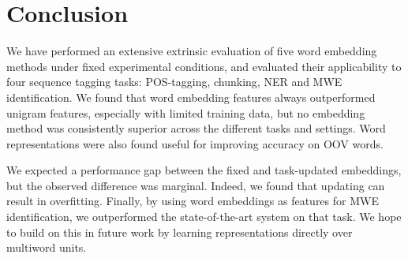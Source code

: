 \section{Conclusion}
We have performed an extensive extrinsic evaluation of five word embedding methods
under fixed experimental conditions, and evaluated their applicability to four sequence tagging tasks: POS-tagging, chunking, NER and MWE identification.
We found that word embedding features always outperformed unigram features, especially with limited training data, but no embedding method was consistently superior across the different tasks and settings.
Word representations were also found useful for improving accuracy on OOV words.

We expected a performance gap between the fixed and task-updated embeddings, but the observed difference was marginal.
Indeed, we found that updating can result in overfitting.
Finally, by using word embeddings as features for MWE identification, we outperformed 
the state-of-the-art system on that task.
We hope to build on this in future work by learning representations directly over multiword units.


